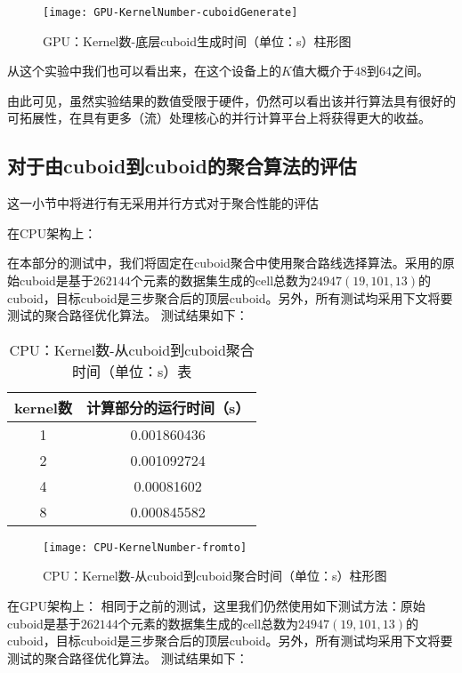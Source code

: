 \begin{figure}[ht]
\centering
\texttt{[image: GPU-KernelNumber-cuboidGenerate]}
\caption{GPU：Kernel数-底层cuboid生成时间（单位：s）柱形图} 
\label{fig:figure3}
\end{figure}

从这个实验中我们也可以看出来，在这个设备上的$K$值大概介于$48$到$64$之间。

由此可见，虽然实验结果的数值受限于硬件，仍然可以看出该并行算法具有很好的可拓展性，在具有更多（流）处理核心的并行计算平台上将获得更大的收益。

\subsection{对于由cuboid到cuboid的聚合算法的评估}

这一小节中将进行有无采用并行方式对于聚合性能的评估

在CPU架构上：

在本部分的测试中，我们将固定在cuboid聚合中使用聚合路线选择算法。采用的原始cuboid是基于$262144$个元素的数据集生成的cell总数为$24947$$(19, 101, 13)$的cuboid，目标cuboid是三步聚合后的顶层cuboid。另外，所有测试均采用下文将要测试的聚合路径优化算法。
测试结果如下：

\begin{table}[!htbp]
\centering
\caption{CPU：Kernel数-从cuboid到cuboid聚合时间（单位：s）表} 
\label{tab:table8}
\begin{tabular}{|c|c|}
    \hline
    kernel数 & 计算部分的运行时间（s）\\
    \hline
    1 & 0.001860436\\
    \hline
    2 & 0.001092724\\
    \hline
    4 & 0.00081602\\
    \hline
    8 & 0.000845582\\
    \hline
\end{tabular}
\end{table}

\begin{figure}[ht]
\centering
\texttt{[image: CPU-KernelNumber-fromto]}
\caption{CPU：Kernel数-从cuboid到cuboid聚合时间（单位：s）柱形图} 
\label{fig:figure4}
\end{figure}

在GPU架构上：
相同于之前的测试，这里我们仍然使用如下测试方法：原始cuboid是基于$262144$个元素的数据集生成的cell总数为$24947$$(19, 101, 13)$的cuboid，目标cuboid是三步聚合后的顶层cuboid。另外，所有测试均采用下文将要测试的聚合路径优化算法。
测试结果如下：

